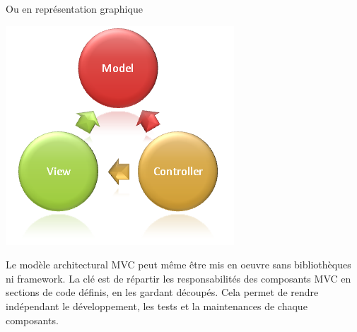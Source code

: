 Ou en représentation graphique

\begin{center}
\includegraphics[scale=0.6]{img/mvc.png}
\label{L'architecture MVC}
\end{center}


Le modèle architectural MVC peut même être mis en oeuvre sans bibliothèques ni framework. La clé est de répartir les responsabilités des composants MVC en sections de code définis, en les gardant découpés. Cela permet de rendre indépendant le développement, les tests et la maintenances de chaque composants.


